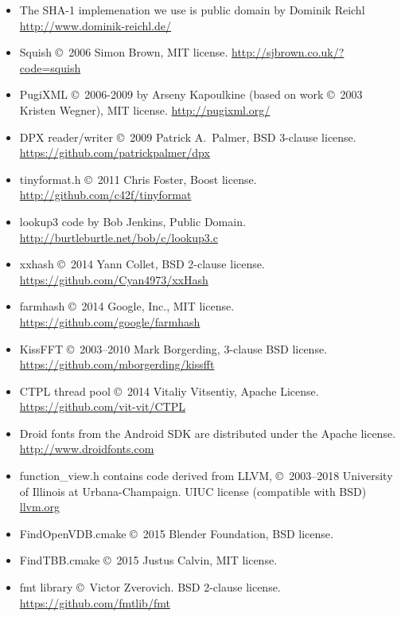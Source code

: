 \begin{itemize}
\item The SHA-1 implemenation we use is public domain by
Dominik Reichl \\ \url{http://www.dominik-reichl.de/}
\item Squish \copyright\ 2006 Simon Brown, MIT license.
\url{http://sjbrown.co.uk/?code=squish}
\item PugiXML \copyright\ 2006-2009 by Arseny Kapoulkine (based on work
\copyright\ 2003 Kristen Wegner), MIT license. \url{http://pugixml.org/}
\item DPX reader/writer \copyright\ 2009 Patrick A.\ Palmer, BSD 3-clause license.
  \\ \url{https://github.com/patrickpalmer/dpx}
\item {\cf tinyformat.h} \copyright\ 2011 Chris Foster, Boost license. \\
  \url{http://github.com/c42f/tinyformat}
\item {\cf lookup3} code by Bob Jenkins, Public Domain. \\
\url{http://burtleburtle.net/bob/c/lookup3.c}
\item {\cf xxhash} \copyright\ 2014 Yann Collet, BSD 2-clause license. \\
\url{https://github.com/Cyan4973/xxHash}
\item {\cf farmhash} \copyright\ 2014 Google, Inc., MIT license.
\url{https://github.com/google/farmhash}
\item {\cf KissFFT} \copyright\ 2003--2010 Mark Borgerding, 3-clause BSD license.
  \\ \url{https://github.com/mborgerding/kissfft}
\item {\cf CTPL} thread pool \copyright\ 2014 Vitaliy Vitsentiy, Apache License.
  \\ \url{https://github.com/vit-vit/CTPL}
\item Droid fonts from the Android SDK are distributed under the
    Apache license. \\ \url{http://www.droidfonts.com}
\item {\cf function_view.h} contains code derived from LLVM,
  \copyright\ 2003--2018 University of Illinois at Urbana-Champaign.
  UIUC license (compatible with BSD) \\ \url{llvm.org}
\item {\cf FindOpenVDB.cmake} \copyright\ 2015 Blender Foundation, BSD license.
\item {\cf FindTBB.cmake} \copyright\ 2015 Justus Calvin, MIT license.
\item {\cf fmt} library \copyright\ Victor Zverovich. BSD 2-clause license. \\
    \url{https://github.com/fmtlib/fmt}
\end{itemize}

